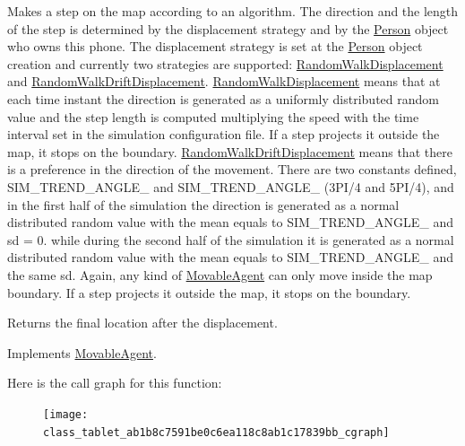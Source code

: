 Makes a step on the map according to an algorithm. The direction and the length of the step is determined by the displacement strategy and by the \hyperlink{class_person}{Person} object who owns this phone. The displacement strategy is set at the \hyperlink{class_person}{Person} object creation and currently two strategies are supported\+: \hyperlink{class_random_walk_displacement}{Random\+Walk\+Displacement} and \hyperlink{class_random_walk_drift_displacement}{Random\+Walk\+Drift\+Displacement}. \hyperlink{class_random_walk_displacement}{Random\+Walk\+Displacement} means that at each time instant the direction is generated as a uniformly distributed random value and the step length is computed multiplying the speed with the time interval set in the simulation configuration file. If a step projects it outside the map, it stops on the boundary. \hyperlink{class_random_walk_drift_displacement}{Random\+Walk\+Drift\+Displacement} means that there is a preference in the direction of the movement. There are two constants defined, S\+I\+M\+\_\+\+T\+R\+E\+N\+D\+\_\+\+A\+N\+G\+L\+E\+\_ and S\+I\+M\+\_\+\+T\+R\+E\+N\+D\+\_\+\+A\+N\+G\+L\+E\+\_ (3\+P\+I/4 and 5\+P\+I/4), and in the first half of the simulation the direction is generated as a normal distributed random value with the mean equals to S\+I\+M\+\_\+\+T\+R\+E\+N\+D\+\_\+\+A\+N\+G\+L\+E\+\_ and sd = 0. while during the second half of the simulation it is generated as a normal distributed random value with the mean equals to S\+I\+M\+\_\+\+T\+R\+E\+N\+D\+\_\+\+A\+N\+G\+L\+E\+\_ and the same sd. Again, any kind of \hyperlink{class_movable_agent}{Movable\+Agent} can only move inside the map boundary. If a step projects it outside the map, it stops on the boundary. \begin{DoxyReturn}{Returns}
the final location after the displacement. 
\end{DoxyReturn}


Implements \hyperlink{class_movable_agent_a88b617f0e78c817634e5b587da045ab0}{Movable\+Agent}.

Here is the call graph for this function\+:
\nopagebreak
\begin{figure}[H]
\begin{center}
\leavevmode
\texttt{[image: class\_tablet\_ab1b8c7591be0c6ea118c8ab1c17839bb\_cgraph]}
\end{center}
\end{figure}
\mbox{\label{class_tablet_a3fae01e7d526699476221c6a686a4fba}} 
